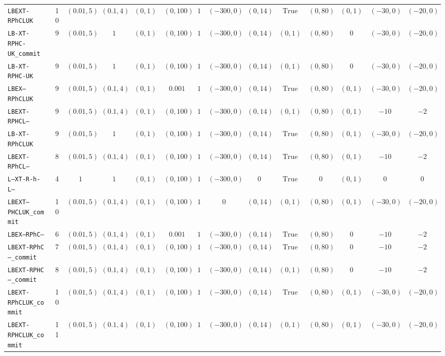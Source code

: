{\begin{tabular}{lccccccccccccc}
\texttt{LBEXT-RPhCLUK} & 10 & $(0.01,5)$ & $(0.1,4)$ & $(0,1)$ & $(0,100)$ & $1$ & $(-300,0)$ & $(0,14)$ & $\mathrm{True}$ & $(0,80)$ & $(0,1)$ & $(-30,0)$ & $(-20,0)$ \\
\texttt{LB-XT-RPHC-UK_commit} & 9 & $(0.01,5)$ & $1$ & $(0,1)$ & $(0,100)$ & $1$ & $(-300,0)$ & $(0,14)$ & $(0,1)$ & $(0,80)$ & $0$ & $(-30,0)$ & $(-20,0)$ \\
\texttt{LB-XT-RPHC-UK} & 9 & $(0.01,5)$ & $1$ & $(0,1)$ & $(0,100)$ & $1$ & $(-300,0)$ & $(0,14)$ & $(0,1)$ & $(0,80)$ & $0$ & $(-30,0)$ & $(-20,0)$ \\
\texttt{LBEX--RPhCLUK} & 9 & $(0.01,5)$ & $(0.1,4)$ & $(0,1)$ & $0.001$ & $1$ & $(-300,0)$ & $(0,14)$ & $\mathrm{True}$ & $(0,80)$ & $(0,1)$ & $(-30,0)$ & $(-20,0)$ \\
\texttt{LBEXT-RPHCL--} & 9 & $(0.01,5)$ & $(0.1,4)$ & $(0,1)$ & $(0,100)$ & $1$ & $(-300,0)$ & $(0,14)$ & $(0,1)$ & $(0,80)$ & $(0,1)$ & $-10$ & $-2$ \\
\texttt{LB-XT-RPhCLUK} & 9 & $(0.01,5)$ & $1$ & $(0,1)$ & $(0,100)$ & $1$ & $(-300,0)$ & $(0,14)$ & $\mathrm{True}$ & $(0,80)$ & $(0,1)$ & $(-30,0)$ & $(-20,0)$ \\
\texttt{LBEXT-RPhCL--} & 8 & $(0.01,5)$ & $(0.1,4)$ & $(0,1)$ & $(0,100)$ & $1$ & $(-300,0)$ & $(0,14)$ & $\mathrm{True}$ & $(0,80)$ & $(0,1)$ & $-10$ & $-2$ \\
\texttt{L--XT-R-h-L--} & 4 & $1$ & $1$ & $(0,1)$ & $(0,100)$ & $1$ & $(-300,0)$ & $0$ & $\mathrm{True}$ & $0$ & $(0,1)$ & $0$ & $0$ \\
\texttt{LBEXT--PHCLUK_commit} & 10 & $(0.01,5)$ & $(0.1,4)$ & $(0,1)$ & $(0,100)$ & $1$ & $0$ & $(0,14)$ & $(0,1)$ & $(0,80)$ & $(0,1)$ & $(-30,0)$ & $(-20,0)$ \\
\texttt{LBEX--RPhC---} & 6 & $(0.01,5)$ & $(0.1,4)$ & $(0,1)$ & $0.001$ & $1$ & $(-300,0)$ & $(0,14)$ & $\mathrm{True}$ & $(0,80)$ & $0$ & $-10$ & $-2$ \\
\texttt{LBEXT-RPhC---_commit} & 7 & $(0.01,5)$ & $(0.1,4)$ & $(0,1)$ & $(0,100)$ & $1$ & $(-300,0)$ & $(0,14)$ & $\mathrm{True}$ & $(0,80)$ & $0$ & $-10$ & $-2$ \\
\texttt{LBEXT-RPHC---_commit} & 8 & $(0.01,5)$ & $(0.1,4)$ & $(0,1)$ & $(0,100)$ & $1$ & $(-300,0)$ & $(0,14)$ & $(0,1)$ & $(0,80)$ & $0$ & $-10$ & $-2$ \\
\texttt{LBEXT-RPhCLUK_commit} & 10 & $(0.01,5)$ & $(0.1,4)$ & $(0,1)$ & $(0,100)$ & $1$ & $(-300,0)$ & $(0,14)$ & $\mathrm{True}$ & $(0,80)$ & $(0,1)$ & $(-30,0)$ & $(-20,0)$ \\
\texttt{LBEXT-RPHCLUK_commit} & 11 & $(0.01,5)$ & $(0.1,4)$ & $(0,1)$ & $(0,100)$ & $1$ & $(-300,0)$ & $(0,14)$ & $(0,1)$ & $(0,80)$ & $(0,1)$ & $(-30,0)$ & $(-20,0)$ \\

\end{tabular}}
